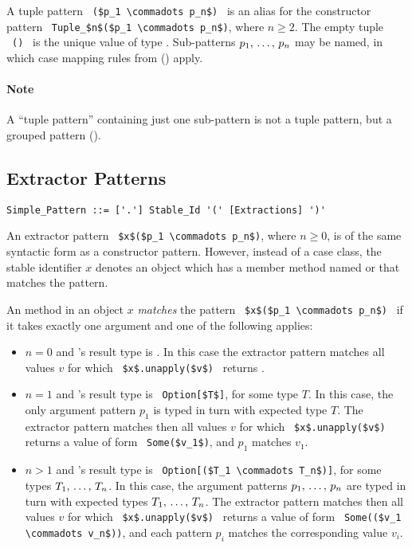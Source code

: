 A tuple pattern ~\lstinline!($p_1 \commadots p_n$)!~ is an alias for the constructor pattern ~\lstinline!Tuple_$n$($p_1 \commadots p_n$)!, where $n \geq 2$. The empty tuple ~\lstinline!()!~ is the unique value of type . Sub-patterns $p_1 ,\, \ldots ,\, p_n$ may be named, in which case mapping rules from () apply. 

\paragraph{Note}
A ``tuple pattern'' containing just one sub-pattern is not a tuple pattern, but a grouped pattern ().





\subsection{Extractor Patterns}
\label{sec:extractor-patterns}

\syntax\begin{lstlisting}
Simple_Pattern ::= ['.'] Stable_Id '(' [Extractions] ')'
\end{lstlisting}

An extractor pattern ~\lstinline!$x$($p_1 \commadots p_n$)!, where $n \geq 0$, is of the same syntactic form as a constructor pattern. However, instead of a case class, the stable identifier $x$ denotes an object which has a member method named  or  that matches the pattern. 

An  method in an object $x$ {\em matches} the pattern ~\lstinline!$x$($p_1 \commadots p_n$)!~ if it takes exactly one argument and one of the following applies: 

\begin{itemize}
  \item[] $n = 0$ and 's result type is . In this case the extractor pattern matches all values $v$ for which ~\lstinline!$x$.unapply($v$)!~ returns . 
  
  \item[] $n = 1$ and 's result type is ~\lstinline!Option[$T$]!, for some type $T$. In this case, the only argument pattern $p_1$ is typed in turn with expected type $T$. The extractor pattern matches then all values $v$ for which ~\lstinline!$x$.unapply($v$)!~ returns a value of form ~\lstinline!Some($v_1$)!, and $p_1$ matches $v_1$. 

  \item[] $n > 1$ and 's result type is ~\lstinline!Option[($T_1 \commadots T_n$)]!, for some types $T_1 ,\, \ldots ,\, T_n$. In this case, the argument patterns $p_1 ,\, \ldots ,\, p_n$ are typed in turn with expected types $T_1 ,\, \ldots ,\, T_n$. The extractor pattern matches then all values $v$ for which ~\lstinline!$x$.unapply($v$)!~ returns a value of form ~\lstinline!Some(($v_1 \commadots v_n$))!, and each pattern $p_i$ matches the corresponding value $v_i$.
  
\end{itemize}


